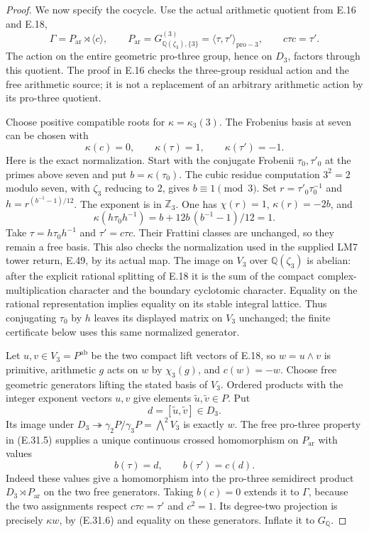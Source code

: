 \documentclass[11pt,oneside]{article}
\begin{document}
\begin{proof}
We now specify the cocycle. Use the actual arithmetic
quotient from E.16 and E.18,
\[
 \Gamma=P_{\mathrm{ar}}\rtimes\langle c\rangle,
 \qquad
 P_{\mathrm{ar}}=G_{\mathbb Q(\zeta_3),\{3\}}^{(3)}
                  =\langle\tau,\tau'\rangle_{\mathrm{pro}-3},
 \qquad c\tau c=\tau'.
 \tag{E.31.5}
\]
The action on the entire geometric pro-three group, hence
on $D_3$, factors through this quotient. The proof in E.16
checks the three-group residual action and the free arithmetic
source; it is not a replacement of an arbitrary arithmetic
action by its pro-three quotient.

Choose positive compatible roots for $\kappa=\kappa_3(3)$.
The Frobenius basis at seven can be chosen with
\[
                    \kappa(c)=0,\qquad
                    \kappa(\tau)=1,\qquad
                    \kappa(\tau')=-1.
 \tag{E.31.6}
\]
Here is the exact normalization. Start with the conjugate
Frobenii $\tau_0,\tau'_0$ at the primes above seven and put
$b=\kappa(\tau_0)$. The cubic residue computation
$3^2=2$ modulo seven, with $\zeta_3$ reducing to $2$,
gives $b\equiv1\pmod3$. Set
$r=\tau'_0\tau_0^{-1}$ and
$h=r^{(b^{-1}-1)/12}$. The exponent is in $\mathbb Z_3$.
One has $\chi(r)=1$, $\kappa(r)=-2b$, and
\[
 \kappa(h\tau_0h^{-1})
    =b+12b\,(b^{-1}-1)/12=1.
\]
Take $\tau=h\tau_0h^{-1}$ and $\tau'=c\tau c$.
Their Frattini classes are unchanged, so they remain a
free basis. This also checks the normalization used in
the supplied LM7 tower return, E.49, by its actual map.
The image on $V_3$ over $\mathbb Q(\zeta_3)$ is abelian:
after the explicit rational splitting of E.18 it is the
sum of the compact complex-multiplication character and
the boundary cyclotomic character. Equality on the rational
representation implies equality on its stable integral
lattice. Thus conjugating $\tau_0$ by $h$ leaves its
displayed matrix on $V_3$ unchanged; the finite certificate
below uses this same normalized generator.

Let $u,v\in V_3=P^{\mathrm{ab}}$ be the two compact
lift vectors of E.18, so $w=u\wedge v$ is primitive,
arithmetic $g$ acts on $w$ by $\chi_3(g)$, and
$c(w)=-w$. Choose free geometric generators lifting
the stated basis of $V_3$. Ordered products with the
integer exponent vectors $u,v$ give elements
$\widetilde u,\widetilde v\in P$. Put
\[
                  d=[\widetilde u,\widetilde v]\in D_3.
\]
Its image under $D_3\twoheadrightarrow
\gamma_2P/\gamma_3P=\bigwedge^2V_3$ is exactly $w$.
The free pro-three property in (E.31.5) supplies a unique
continuous crossed homomorphism on $P_{\mathrm{ar}}$
with values
\[
                       b(\tau)=d,\qquad b(\tau')=c(d).
\]
Indeed these values give a homomorphism into the pro-three
semidirect product $D_3\rtimes P_{\mathrm{ar}}$ on the two
free generators. Taking $b(c)=0$ extends it to $\Gamma$,
because the two assignments respect $c\tau c=\tau'$ and
$c^2=1$. Its degree-two projection is precisely
$\kappa w$, by (E.31.6) and equality on these generators.
Inflate it to $G_{\mathbb Q}$.


\end{proof}
\end{document}
